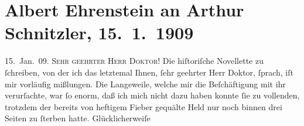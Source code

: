 

         
         \renewcommand{\erwaehntePersonen}{Personen: Albert Ehrenstein}
         \renewcommand{\erwaehnteInstitutionen}{Institutionen: Österreichische Rundschau}
         \renewcommand{\erwaehnteOrte}{Orte: Wien}
         \renewcommand{\erwaehnteWerke}{Werke: Die Lage in Ungarn (Siebenbürgen und Serbien ausgenommen) im Jahre 1790, Tai-Gin, Tod des Zehir eddin Muhammed Baber}
               \section[Albert Ehrenstein an Arthur Schnitzler, 15. 1. 1909]{ Albert Ehrenstein an Arthur Schnitzler, 15. 1. 1909}\nopagebreak{}\rehead{ }\begin{ledgroupsized}[t]{13cm}\normalsize\beginnumbering{} \toendnotes[C]{\smallbreak\pagebreak[2]} 
\toendnotes[C]{\smallbreak}\pstart
           \raggedleft{}{\pb}15. Jan. 09.\pend
           \pstart{}\textsc{Sehr geehrter Herr Doktor!}\pend\pstart
           Die hiſtoriſche Novellette zu ſchreiben, von der ich das letztemal Ihnen, ſehr geehrter Herr
               Doktor, ſprach, iſt mir vorläufig mißlungen. Die Langeweile, welche mir die
               Beſchäftigung mit ihr verurſachte, war ſo enorm, daß ich mich nicht dazu haben konnte
               ſie zu vollenden, trotzdem der bereits von heftigem Fieber gequälte Held nur noch
               binnen drei Seiten zu ſterben hatte. Glücklicherweiſe \label{K_L01822-1v}
\end{ledgroupsized}
